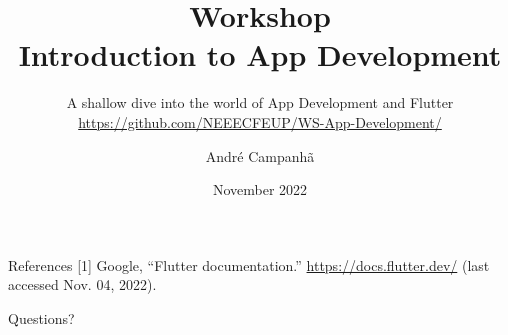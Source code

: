 \documentclass[10pt]{beamer}
\title{Workshop\\Introduction to App Development}
\subtitle{A shallow dive into the world of App Development and Flutter\texorpdfstring{\\ \url{https://github.com/NEEECFEUP/WS-App-Development/}}{}}
\institute{NEEEC - FEUP}
\date{November 2022}
\author{André Campanhã}
\begin{document}
\begin{frame}
  \maketitle
\end{frame}



\begin{frame}{References}
  [1] Google, “Flutter documentation.” \url{https://docs.flutter.dev/} (last accessed Nov. 04, 2022).
\end{frame}

{
  \begin{frame}[standout]
    Questions?
  \end{frame}
}
\end{document}
